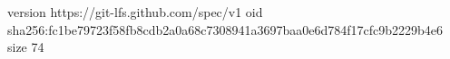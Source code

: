 version https://git-lfs.github.com/spec/v1
oid sha256:fc1be79723f58fb8cdb2a0a68c7308941a3697baa0e6d784f17cfc9b2229b4e6
size 74
